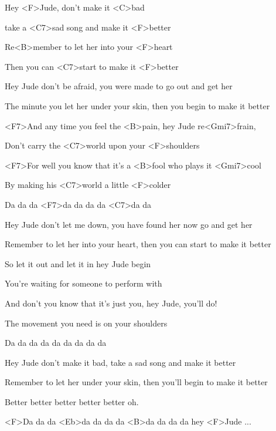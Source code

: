 

\zs
Hey <F>Jude, don't make it <C>bad

take a <C7>sad song and make it <F>better

Re<B>member to let her into your <F>heart

Then you can <C7>start to make it <F>better
\ks

\zs
Hey Jude don't be afraid,
you were made to go out and get her

The minute you let her under your skin,
then you begin to make it better
\ks

\zr
<F7>And any time you feel the <B>pain, hey Jude re<Gmi7>frain,

Don't carry the <C7>world upon your <F>shoulders

<F7>For well you know that it's a <B>fool who plays it <Gmi7>cool

By making his <C7>world a little <F>colder

Da da da <F7>da da da da <C7>da da
\kr

\zs
Hey Jude don't let me down,
you have found her now go and get her

Remember to let her into your heart,
then you can start to make it better
\ks

\zr
So let it out and let it in hey Jude begin

You're waiting for someone to perform with

And don't you know that it's just you, hey Jude, you'll do!

The movement you need is on your shoulders

Da da da da da da da da da
\kr

\zs
Hey Jude don't make it bad,
take a sad song and make it better

Remember to let her under your skin,
then you'll begin to make it better

Better better better better better oh.
\ks

<F>Da da da <Eb>da da da da <B>da da da da hey <F>Jude ...

\kp





